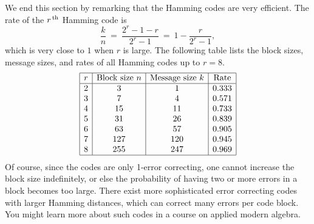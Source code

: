 We end this section by remarking that the Hamming codes are very
efficient. The rate of the $r^{\,\rm th}$ Hamming code is
\begin{equation*}
  \frac{k}{n}
  ~=~ \frac{2^r-1-r}{2^r-1}
  ~=~ 1 - \frac{r}{2^r-1},
\end{equation*}
which is very close to $1$ when $r$ is large. The following table
lists the block sizes, message sizes, and rates of all Hamming codes
up to $r=8$.
\begin{equation*}
  \begin{array}{|c|c|c|c|}
    \hline
    r & \mbox{Block size $n$} & \mbox{Message size $k$} & \mbox{Rate} \\\hline
    2  & 3    & 1    & 0.333 \\
    3  & 7    & 4    & 0.571 \\
    4  & 15   & 11   & 0.733 \\
    5  & 31   & 26   & 0.839 \\
    6  & 63   & 57   & 0.905 \\
    7  & 127  & 120  & 0.945 \\
    8  & 255  & 247  & 0.969 \\
    \hline
  \end{array}    
\end{equation*}
Of course, since the codes are only 1-error correcting, one cannot
increase the block size indefinitely, or else the probability of
having two or more errors in a block becomes too large. There exist
more sophisticated error correcting codes with larger Hamming
distances, which can correct many errors per code block. You might
learn more about such codes in a course on applied modern algebra.
